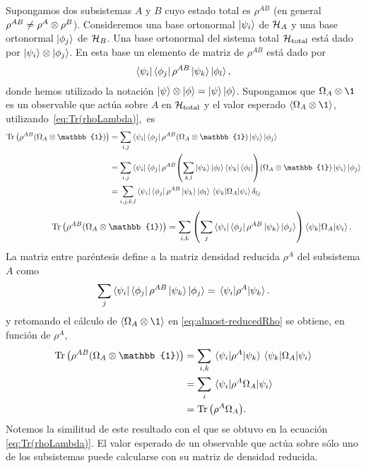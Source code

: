Supongamos dos subsistemas $A$ y $B$ cuyo estado total es 
$\rho^{AB}$ (en general $\rho^{AB}\neq \rho^A\otimes \rho^B$). 
Consideremos una base ortonormal $\ket{\psi_i}$ de $\mathcal{H}_A$ y una 
base ortonormal $\ket{\phi_j}$ de $\mathcal{H}_B$. Una base ortonormal 
del sistema total $\mathcal{H}_{\text{total}}$ está dado 
por $\ket{\psi_i}\otimes \ket{\phi_j}$.
En esta base un elemento de matriz de $\rho^{AB}$ está dado por
\begin{align}
	\bra{\psi_i}\bra{\phi_j}\rho^{AB}\ket{\psi_k}\ket{\phi_l},
\end{align}
donde hemos utilizado la notación 
$\ket{\psi}\otimes\ket{\phi}=\ket{\psi}\ket{\phi}$.
Supongamos que $\Omega_A\ot \1$ es un observable que actúa sobre $A$
en $\mathcal{H}_{\text{total}}$ y el valor esperado 
$\expval{\Omega_A\ot \1}$, utilizando~\eqref{eq:Tr(rhoLambda)},~es
\begin{align}
	\Tr \qty(\rho^{AB}\qty(\Omega_A\ot \mathbb{1})) &= \sum _{i,j} 
	\bra{\psi_i}\bra{\phi_j}\rho^{AB}\qty(\Omega_A\ot \mathbb{1})
	\ket{\psi_i}\ket{\phi_j} 
	\nonumber\\
	&= \sum _{i,j} 
	\bra{\psi_i} \bra{\phi_j}\rho^{AB}
	\qty(\sum _{k,l} \ket{\psi_k} \ket{\phi_l} \bra{\psi_k}\bra{\phi_l} )
	\qty(\Omega_A\ot \mathbb{1})\ket{\psi_i} \ket{\phi_j}\nonumber\\
	&= \sum _{i,j,k,l} 
	\bra{\psi_i} \bra{\phi_j}\rho^{AB}\ket{\psi_k} \ket{\phi_l}
	\matrixel{\psi_k}{\Omega_A}{\psi_i}\delta _{lj}\nonumber
\end{align}
\begin{align}
	\hspace{1.81cm}
	\Tr \qty(\rho^{AB}\qty(\Omega_A\ot \mathbb{1}))&= \sum_{i,k}\qty(\sum _j 
	\bra{\psi_i} \bra{\phi_j}\rho^{AB}\ket{\psi_k} \ket{\phi_j})
	\matrixel{\psi_k}{\Omega_A}{\psi_i}.
	\label{eq:almost-reducedRho}
\end{align}
La matriz entre paréntesis define a la matriz densidad
reducida $\rho^A$ del subsistema $A$ como~\cite{chandra2013quantum}
\begin{align}
	\sum _j \bra{\psi_i}\bra{\phi_j}\rho^{AB}\ket{\psi_k}\ket{\phi_j}
	= \matrixel{\psi_i}{\rho^A}{\psi_k}.
	\label{eq:reducedRho-def1}
\end{align}
y retomando el cálculo de $\expval{\Omega_A\ot \1}$
en \eqref{eq:almost-reducedRho} se obtiene, en función de $\rho^A$,
\begin{align}
	\Tr \qty(\rho^{AB}\qty(\Omega_A\ot \mathbb{1}))&= \sum _{i,k}\nonumber
	\matrixel{\psi_i}{\rho^A}{\psi_k} \matrixel{\psi_k}{\Omega_A}{\psi_i}
	\nonumber\\
	&= \sum_i \matrixel{\psi_i}{\rho^A\Omega_A}{\psi_i}\nonumber\\
	&= \Tr \qty(\rho^A\Omega_A). \label{eq:reduced-works}
\end{align}
Notemos la similitud de este resultado con el que se obtuvo en la ecuación
\eqref{eq:Tr(rhoLambda)}. El valor esperado de un observable que actúa 
sobre sólo uno de los subsistemas puede calcularse con su matriz de 
densidad reducida.


